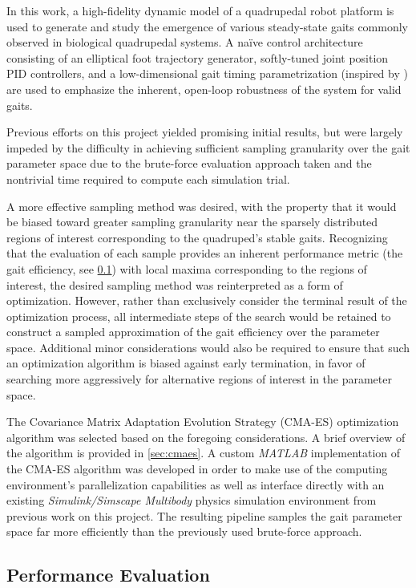 \documentclass[conference,11pt,letterpaper]{IEEEtran}
\begin{document}
In this work, a high-fidelity dynamic model of a quadrupedal robot platform is used to generate and study the emergence of various steady-state gaits commonly observed in biological quadrupedal systems. A na{\"i}ve control architecture consisting of an elliptical foot trajectory generator, softly-tuned joint position PID controllers, and a low-dimensional gait timing parametrization (inspired by \autocite{Hildebrand701}) are used to emphasize the inherent, open-loop robustness of the system for valid gaits. 

Previous efforts on this project yielded promising initial results, but were largely impeded by the difficulty in achieving sufficient sampling granularity over the gait parameter space due to the brute-force evaluation approach taken and the nontrivial time required to compute each simulation trial. 

A more effective sampling method was desired, with the property that it would be biased toward greater sampling granularity near the sparsely distributed regions of interest corresponding to the quadruped's stable gaits. Recognizing that the evaluation of each sample provides an inherent performance metric (the gait efficiency, see \cref{sec:performance}) with local maxima corresponding to the regions of interest, the desired sampling method was reinterpreted as a form of optimization. However, rather than exclusively consider the terminal result of the optimization process, all intermediate steps of the search would be retained to construct a sampled approximation of the gait efficiency over the parameter space. Additional minor considerations would also be required to ensure that such an optimization algorithm is biased against early termination, in favor of searching more aggressively for alternative regions of interest in the parameter space.

The Covariance Matrix Adaptation Evolution Strategy (CMA-ES) optimization algorithm \autocite{hansen2001} was selected based on the foregoing considerations. A brief overview of the algorithm is provided in \cref{sec:cmaes}. A custom \emph{MATLAB} implementation of the CMA-ES algorithm was developed in order to make use of the computing environment's parallelization capabilities as well as interface directly with an existing \emph{Simulink/Simscape Multibody} physics simulation environment from previous work on this project. The resulting pipeline samples the gait parameter space far more efficiently than the previously used brute-force approach.

\subsection{Performance Evaluation} \label{sec:performance}
\end{document}
